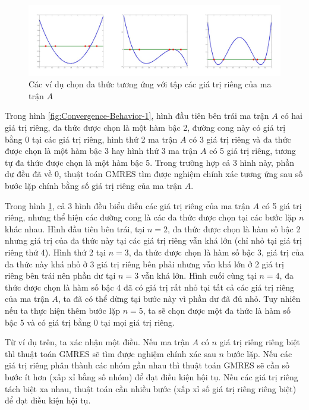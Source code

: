 \documentclass[14pt, a4paper]{article}
\numberwithin{equation}{section}
\numberwithin{algorithm}{section}
\numberwithin{figure}{section}
\numberwithin{dl}{section}
\numberwithin{md}{section}
\numberwithin{bd}{section}
\numberwithin{dn}{section}
\begin{document}
\begin{figure}[h!] \centering

    \includegraphics[scale=0.5]{Convergence-Behavior-2.jpg}
    \caption{Các ví dụ chọn đa thức tương ứng với tập các giá trị riêng của ma trận $A$}

    \label{fig:Convergence-Behavior-2}
\end{figure}

Trong hình \ref{fig:Convergence-Behavior-1}, hình đầu tiên bên trái ma trận $A$ có hai giá trị riêng, đa thức được chọn là một hàm bậc 2, đường cong này có giá trị bằng 0 tại các giá trị riêng, hình thứ 2 ma trận $A$ có 3 giá trị riêng và đa thức được chọn là một hàm bậc 3 hay hình thứ 3 ma trận $A$ có 5 giá trị riêng, tương tự đa thức được chọn là một hàm bậc 5. Trong trường hợp cả 3 hình này, phần dư đều đã về 0, thuật toán GMRES tìm được nghiệm chính xác tương ứng sau số bước lặp chính bằng số giá trị riêng của ma trận $A$.

Trong hình \ref{fig:Convergence-Behavior-2}, cả 3 hình đều biểu diễn các giá trị riêng của ma trận $A$ có 5 giá trị riêng, nhưng thể hiện các đường cong là các đa thức được chọn tại các bước lặp $n$ khác nhau. Hình đầu tiên bên trái, tại $n=2$, đa thức được chọn là hàm số bậc 2 nhưng giá trị của đa thức này tại các giá trị riêng vẫn khá lớn (chỉ nhỏ tại giá trị riêng thứ 4). Hình thứ 2 tại $n=3$, đa thức được chọn là hàm số bậc 3, giá trị của đa thức này khá nhỏ ở 3 giá trị riêng bên phải nhưng vẫn khá lớn ở 2 giá trị riêng bên trái nên phần dư tại $n=3$ vẫn khá lớn. Hình cuối cùng tại $n=4$, đa thức được chọn là hàm số bậc 4 đã có giá trị rất nhỏ tại tất cả các giá trị riêng của ma trận $A$, ta đã có thể dừng tại bước này vì phần dư đã đủ nhỏ. Tuy nhiên nếu ta thực hiện thêm bước lặp $n=5$, ta sẽ chọn được một đa thức là hàm số bậc 5 và có giá trị bằng 0 tại mọi giá trị riêng.

Từ ví dụ trên, ta xác nhận một điều. Nếu ma trận $A$ có $n$ giá trị riêng riêng biệt thì thuật toán GMRES sẽ tìm được nghiệm chính xác sau $n$ bước lặp. Nếu các giá trị riêng phân thành các nhóm gần nhau thì thuật toán GMRES sẽ cần số bước ít hơn (xấp xỉ bằng số nhóm) để đạt điều kiện hội tụ. Nếu các giá trị riêng tách biệt xa nhau, thuật toán cần nhiều bước (xấp xỉ số giá trị riêng riêng biệt) để đạt điều kiện hội tụ.
\end{document}
